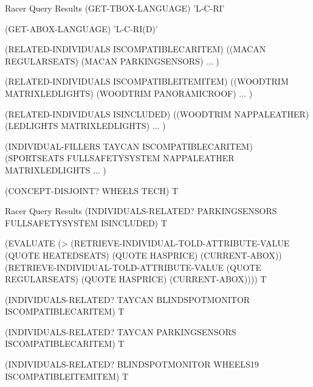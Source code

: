 \documentclass{beamer}
\begin{document}
\begin{frame}{Racer Query Results}
(GET-TBOX-LANGUAGE) \rightarrow 'L-C-RI'
    
(GET-ABOX-LANGUAGE) \rightarrow 'L-C-RI(D)'

(RELATED-INDIVIDUALS ISCOMPATIBLECARITEM) \rightarrow ((MACAN REGULARSEATS) (MACAN PARKINGSENSORS) ... )

(RELATED-INDIVIDUALS ISCOMPATIBLEITEMITEM) \rightarrow ((WOODTRIM MATRIXLEDLIGHTS) (WOODTRIM PANORAMICROOF) ... )

(RELATED-INDIVIDUALS ISINCLUDED) \rightarrow ((WOODTRIM NAPPALEATHER) (LEDLIGHTS MATRIXLEDLIGHTS) ... )

(INDIVIDUAL-FILLERS TAYCAN ISCOMPATIBLECARITEM) \rightarrow (SPORTSEATS FULLSAFETYSYSTEM NAPPALEATHER MATRIXLEDLIGHTS ... )

(CONCEPT-DISJOINT? WHEELS TECH) \rightarrow T

\end{frame}

\begin{frame}{Racer Query Results}
    (INDIVIDUALS-RELATED? PARKINGSENSORS FULLSAFETYSYSTEM ISINCLUDED) \rightarrow T

(EVALUATE (> (RETRIEVE-INDIVIDUAL-TOLD-ATTRIBUTE-VALUE (QUOTE HEATEDSEATS) (QUOTE HASPRICE) (CURRENT-ABOX)) (RETRIEVE-INDIVIDUAL-TOLD-ATTRIBUTE-VALUE (QUOTE REGULARSEATS) (QUOTE HASPRICE) (CURRENT-ABOX)))) \rightarrow T

(INDIVIDUALS-RELATED? TAYCAN BLINDSPOTMONITOR ISCOMPATIBLECARITEM) \rightarrow T

(INDIVIDUALS-RELATED? TAYCAN PARKINGSENSORS ISCOMPATIBLECARITEM) \rightarrow T

(INDIVIDUALS-RELATED? BLINDSPOTMONITOR WHEELS19 ISCOMPATIBLEITEMITEM) \rightarrow T
\end{frame}
\end{document}
